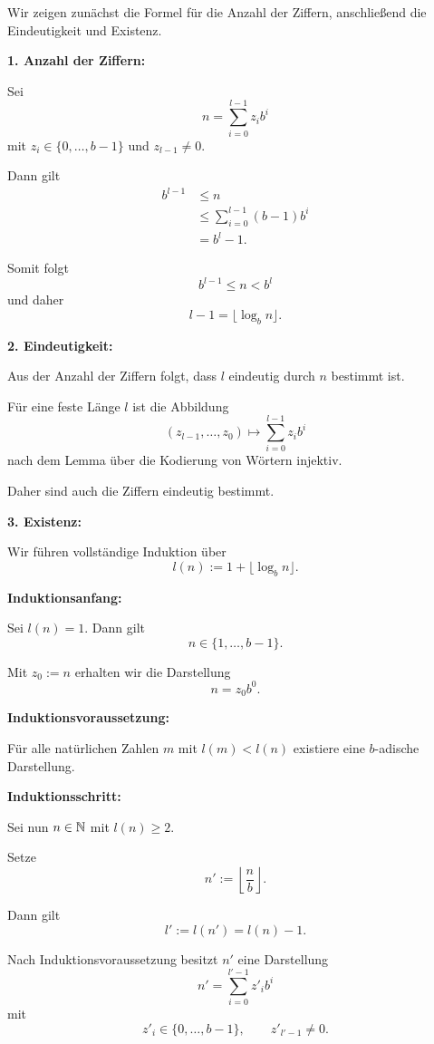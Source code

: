 \begin{myproof}
  Wir zeigen zunächst die Formel für die Anzahl der
  Ziffern, anschließend die Eindeutigkeit und Existenz.

  \medskip
  \textbf{1. Anzahl der Ziffern:}

  Sei
  \[
    n=\sum_{i=0}^{l-1}z_i b^i
  \]
  mit $z_i\in\{0,\dots,b-1\}$ und $z_{l-1}\ne0$.

  Dann gilt
  \begin{align*}
    b^{l-1}
    &\le n\\
    &\le\sum_{i=0}^{l-1}(b-1)b^i\\
    &=b^l-1.
  \end{align*}

  Somit folgt
  \[
    b^{l-1}\le n<b^l
  \]
  und daher
  \[
    l-1=\lfloor\log_b n\rfloor.
  \]

  \medskip
  \textbf{2. Eindeutigkeit:}

  Aus der Anzahl der Ziffern folgt, dass $l$
  eindeutig durch $n$ bestimmt ist.

  Für eine feste Länge $l$ ist die Abbildung
  \[
    (z_{l-1},\dots,z_0)
    \longmapsto
    \sum_{i=0}^{l-1}z_i b^i
  \]
  nach dem Lemma über die Kodierung von Wörtern
  injektiv.

  Daher sind auch die Ziffern eindeutig bestimmt.

  \medskip
  \textbf{3. Existenz:}

  Wir führen vollständige Induktion über
  \[
    l(n):=1+\lfloor\log_b n\rfloor.
  \]

  \textbf{Induktionsanfang:}

  Sei $l(n)=1$. Dann gilt
  \[
    n\in\{1,\dots,b-1\}.
  \]

  Mit $z_0:=n$ erhalten wir die Darstellung
  \[
    n=z_0b^0.
  \]

  \textbf{Induktionsvoraussetzung:}

  Für alle natürlichen Zahlen $m$ mit
  $l(m)<l(n)$ existiere eine $b$-adische
  Darstellung.

  \textbf{Induktionsschritt:}

  Sei nun $n\in\mathbb{N}$ mit $l(n)\ge2$.

  Setze
  \[
    n':=\left\lfloor\frac nb\right\rfloor.
  \]

  Dann gilt
  \[
    l':=l(n')=l(n)-1.
  \]

  Nach Induktionsvoraussetzung besitzt $n'$
  eine Darstellung
  \[
    n'=\sum_{i=0}^{l'-1}z'_i b^i
  \]
  mit
  \[
    z'_i\in\{0,\dots,b-1\},
    \qquad z'_{l'-1}\ne0.
  \]


\end{myproof}
